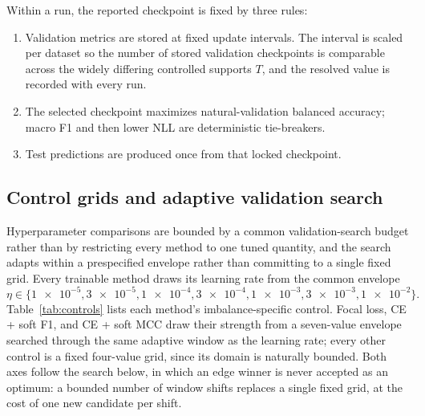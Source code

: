 \documentclass[11pt]{article}
\begin{document}
\noindent Within a run, the reported checkpoint is fixed by three rules:
\begin{enumerate}
  \item Validation metrics are stored at fixed update intervals. The interval is scaled per dataset so the number of stored validation checkpoints is comparable across the widely differing controlled supports $T$, and the resolved value is recorded with every run.
  \item The selected checkpoint maximizes natural-validation balanced accuracy; macro F1 and then lower NLL are deterministic tie-breakers.
  \item Test predictions are produced once from that locked checkpoint.
\end{enumerate}

\subsection{Control grids and adaptive validation search}
\label{app:controls}
Hyperparameter comparisons are bounded by a common validation-search budget rather than by restricting every method to one tuned quantity, and the search adapts within a prespecified envelope rather than committing to a single fixed grid. Every trainable method draws its learning rate from the common envelope
\begin{equation}
  \eta\in\{\num{1e-5},\num{3e-5},\num{1e-4},\num{3e-4},\num{1e-3},\num{3e-3},\num{1e-2}\}.
  \label{eq:learning-rate-grid}
\end{equation}
\noindent Table~\ref{tab:controls} lists each method's imbalance-specific control. Focal loss, CE + soft F1, and CE + soft MCC draw their strength from a seven-value envelope searched through the same adaptive window as the learning rate; every other control is a fixed four-value grid, since its domain is naturally bounded. Both axes follow the search below, in which an edge winner is never accepted as an optimum: a bounded number of window shifts replaces a single fixed grid, at the cost of one new candidate per shift.
\end{document}

